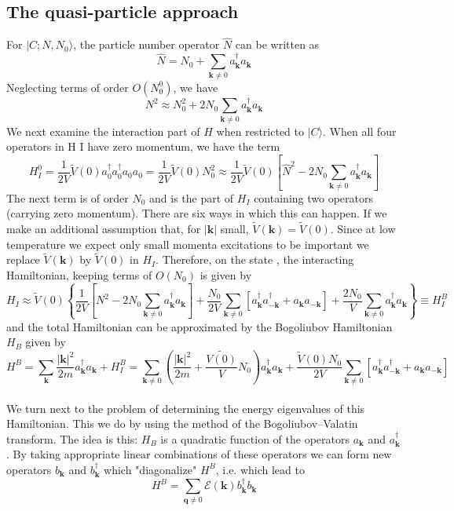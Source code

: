 \subsection{The quasi-particle approach}
For $|C;N,N_0\rangle$, the particle number operator $\hat{N}$ can be written as
\[\hat{N} = N_0 + \sum_{\bm{k}\neq 0}a_{\bm{k}}^{\dagger} a_{\bm{k}} \]
Neglecting terms of order $O(N_0^0)$, we have
\[N^2 \approx N_0^2 + 2N_0\sum_{\bm{k}\neq 0}a_{\bm{k}}^{\dagger} a_{\bm{k}} \]
We next examine the interaction part of $H$ when restricted to $|C\rangle$. When all four operators in H I have zero momentum, we have the term
\[H_I^0 = \frac{1}{2V} \tilde{V}(0) a^{\dagger}_{0} a^{\dagger}_{0} a_{0} a_{0} = \frac{1}{2V}\tilde{V}(0)N_0^2 \approx  \frac{1}{2V}\tilde{V}(0) \left[\hat{N}^2-2N_0\sum_{\bm{k}\neq 0}a_{\bm{k}}^{\dagger} a_{\bm{k}} \right]\]
The next term is of order $N_0$ and is the part of $H_I$ containing two operators (carrying zero momentum). There are six ways in which this can happen. If we make an additional assumption that, for $|\bm{k}|$ small, $\tilde{V}(\bm{k}) = \tilde{V}(0)$. 
Since at low temperature we expect only small momenta excitations to be important we replace $\tilde{V}(\bm{k})$ by $\tilde{V}(0)$ in $H_I$. Therefore, on the state , the interacting Hamiltonian, keeping terms of $O(N_0)$ is given by
\[H_I \approx \tilde{V}(0) \left\{ \frac{1}{2V}\left[N^2-2N_0\sum_{\bm{k}\neq 0}a_{\bm{k}}^{\dagger} a_{\bm{k}} \right]  +\frac{N_0}{2V}\sum_{\bm{k}\neq 0} [a^{\dagger}_{\bm{k}} a^{\dagger}_{-\bm{k}} + a_{\bm{k}} a_{-\bm{k}}] +\frac{2N_0}{V} \sum_{\bm{k}\neq 0}a_{\bm{k}}^{\dagger} a_{\bm{k}} \right\} \equiv H_I^B \] 
and the total Hamiltonian can be approximated by the Bogoliubov Hamiltonian $H_B$ given by
\[H^B = \sum_{\bm{k}} \frac{|\bm{k}|^2}{2m} a_{\bm{k}}^{\dagger} a_{\bm{k}} + H_I^B = \sum_{\bm{k}\neq 0} \left(\frac{|\bm{k}|^2}{2m} + \frac{\tilde{V(0)}}{V}N_0 \right)a_{\bm{k}}^{\dagger} a_{\bm{k}}  + \frac{\tilde{V}(0)N_0}{2V} \sum_{\bm{k}\neq 0} [a^{\dagger}_{\bm{k}} a^{\dagger}_{-\bm{k}} + a_{\bm{k}} a_{-\bm{k}}]\]
\\
We turn next to the problem of determining the energy eigenvalues of this Hamiltonian. This we do by using the method of the Bogoliubov–Valatin transform. 
The idea is this: $H_B$ is a quadratic function of the operators $a_{\bm{k}}$ and $a^{\dagger}_{\bm{k}}$. 
By taking appropriate linear combinations of these operators we can form new operators $b_{\bm{k}}$ and $b^{\dagger}_{\bm{k}}$ which "diagonalize" $H^B$, i.e. which lead to
\[H^B = \sum_{\bm{q} \neq 0} \mathcal{E}(\bm{k})b^{\dagger}_{\bm{k}} b_{\bm{k}} \]
